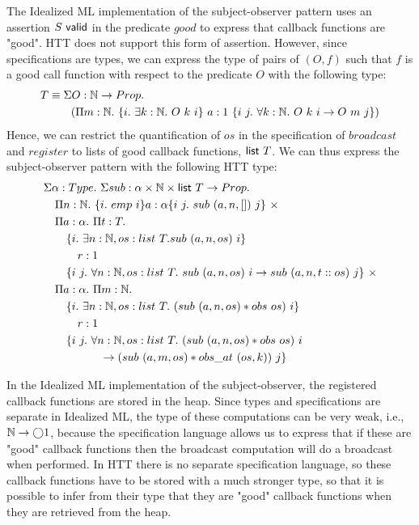 The Idealized ML implementation of the subject-observer pattern uses an
assertion $S\mbox{\textsf{{ valid}}}$ in the predicate $good$ to express that callback functions
are "good". HTT does not support this form of assertion. However, since
specifications are types, we can express the type of pairs of $(O, f)$ such
that $f$ is a good call function with respect to the predicate $O$ with the
following type: 
\begin{align*}
T &\equiv \Sigma O : \N \rightarrow \HPROP.\\
&\quad\quad (\Pi m : \N.\ \{ i.\ \exists k : \N.\ O\ k\ i\}\ a : 1\ \{ i\ j.\ \forall k : \N.\ O\ k\ i \rightarrow O\ m\ j \})
\end{align*}
Hence, we can restrict the quantification of $os$ in the specification of
$broadcast$ and $register$ to lists of good callback functions, $\mbox{\textsf{{list }}}{T}$.
We can thus express the subject-observer pattern with the following HTT type:
\begin{align*}
&\Sigma \alpha : \TYPE.\ \Sigma sub : \alpha \times \N \times \listtype T
\rightarrow \HPROP.\\
&\quad \Pi n : \N.\ \{ i.\ emp\ i \} a : \alpha \{ i\ j.\ sub\ (a, n, [])\ j \}\ \times\\
&\quad \Pi a : \alpha.\ \Pi t : T.\\
&\quad\quad\{ i.\ \exists n : \N, os : list\ T. sub\ (a, n, os)\ i \}\\
&\quad\quad\quad r : 1\\
&\quad\quad \{ i\ j.\ \forall n : \N, os : list\ T.\ sub\ (a, n, os)\ i \rightarrow sub\ (a, n, t::os)\ j
\}\ \times\\
&\quad \Pi a : \alpha.\ \Pi m : \N.\\
&\quad\quad\{ i.\ \exists n : \N, os : list\ T.\ (sub\ (a, n, os) * obs\ os)\ i \}\\
&\quad\quad\quad r : 1\\
&\quad\quad \{ i\ j.\ \forall n : \N, os : list\ T.\ (sub\ (a, n, os) * obs\ os)\ i\\
&\quad\quad\quad\quad\quad \rightarrow (sub\ (a, m, os) * obs\_at\ (os, k))\ j \}
\end{align*}

In the Idealized ML implementation of the subject-observer, the registered
callback functions are stored in the heap. Since types and specifications are
separate in Idealized ML, the type of these computations can be very weak,
i.e., $\mathbb{N} \rightarrow \bigcirc{1}$, because the specification language allows us
to express that if these are "good" callback functions then the broadcast
computation will do a broadcast when performed. In HTT there is no separate
specification language, so these callback functions have to be stored with a
much stronger type, so that it is possible to infer from their type that they
are "good" callback functions when they are retrieved from the heap.  

